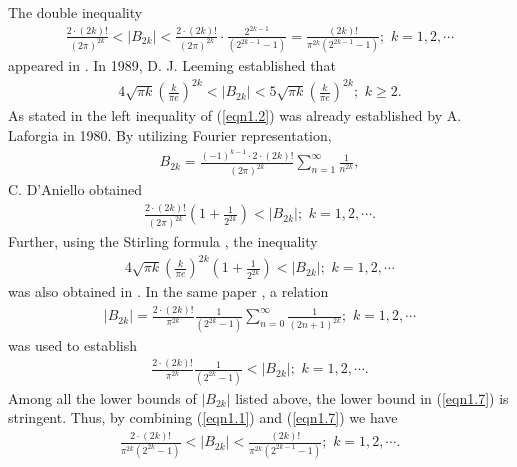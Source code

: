 \documentclass[eqnumis, pdf]{yjb}
\begin{document}
The double inequality 
\begin{align}\label{eqn1.1}
\frac{2 \cdot(2k)!}{(2 \pi)^{2k}} < \vert B_{2k} \vert < \frac{2 \cdot(2k)!}{(2 \pi)^{2k}} \cdot \frac{2^{2k-1}}{(2^{2k-1}-1)} = \frac{(2k)!}{\pi^{2k}(2^{2k-1}-1)}; \, \, k = 1, 2, \cdots
\end{align}
 appeared in \cite[p. 805; 23.1.15]{abramowitz}. In 1989, D. J. Leeming \cite[p. 128]{leeming} established that 
\begin{align}\label{eqn1.2}
4 \sqrt{\pi k} \left( \frac{k}{\pi e} \right)^{2k} < \vert B_{2k} \vert < 5 \sqrt{\pi k}\left( \frac{k}{\pi e} \right)^{2k}; \, \, k \geq 2.
\end{align}
As stated in \cite{daniello} the left inequality of (\ref{eqn1.2}) was already established by A. Laforgia \cite[p. 2]{laforgia} in 1980. By utilizing Fourier representation, 
\begin{align}\label{eqn1.3}
B_{2k} = \frac{(-1)^{k-1} \cdot 2 \cdot (2k)!}{(2\pi)^{2k}} \sum_{n=1}^\infty \frac{1}{n^{2k}},
\end{align}
 C. D'Aniello \cite{daniello} obtained 
\begin{align}\label{eqn1.4}
\frac{2 \cdot(2k)!}{(2 \pi)^{2k}} \left( 1 + \frac{1}{2^{2k}} \right) < \vert B_{2k} \vert ; \, \, k = 1, 2, \cdots.
\end{align}
Further, using the Stirling formula \cite{abramowitz}, the inequality 
\begin{align}\label{eqn1.5}
4 \sqrt{\pi k} \left( \frac{k}{\pi e} \right)^{2k} \left( 1 + \frac{1}{2^{2k}} \right) < \vert B_{2k} \vert ; \, \, k = 1, 2, \cdots
\end{align}
was also obtained in \cite{daniello}. In the same paper \cite{daniello}, a relation \cite[p. 807]{abramowitz}
\begin{align}\label{eqn1.6}
\vert B_{2k} \vert = \frac{2 \cdot (2k)!}{\pi^{2k}} \frac{1}{(2^{2k}-1)}\sum_{n=0}^\infty \frac{1}{(2n+1)^{2k}} ; \, \, k = 1, 2, \cdots
\end{align}
was used to establish 
\begin{align}\label{eqn1.7}
\frac{2 \cdot (2k)!}{\pi^{2k}} \frac{1}{(2^{2k}-1)} < \vert B_{2k} \vert ; \, \, k = 1, 2, \cdots.
\end{align}
Among all the lower bounds of $ \vert B_{2k} \vert $ listed above, the lower bound in (\ref{eqn1.7}) is stringent. Thus, by combining (\ref{eqn1.1}) and (\ref{eqn1.7}) we have 
\begin{align}\label{eqn1.8}
\frac{2 \cdot(2k)!}{\pi^{2k}(2^{2k}-1)} < \vert B_{2k} \vert <  \frac{(2k)!}{\pi^{2k}(2^{2k-1}-1)}; \, \, k = 1, 2, \cdots.
\end{align}
\end{document}
